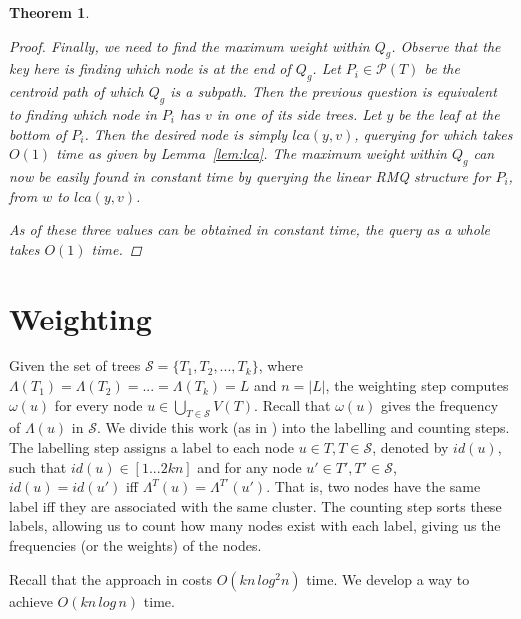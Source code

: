 \documentclass[12pt,a4paper]{article}
\newcommand{\leafset}{\Lambda}
\newcommand{\weight}{\omega}
\newtheorem{rmqquery}[incompatibility]{Theorem}
\begin{document}
\begin{rmqquery}
\begin{proof}
            Finally, we need to find the maximum weight within $Q_g$. Observe that the key here is finding which node is at the end of $Q_g$. Let $P_i \in \mathcal{P}(T)$ be the centroid path of which $Q_g$ is a subpath. Then the previous question is equivalent to finding which node in $P_i$ has $v$ in one of its side trees. Let $y$ be the leaf at the bottom of $P_i$. Then the desired node is simply $lca(y, v)$, querying for which takes $O(1)$ time as given by Lemma~\ref{lem:lca}. The maximum weight within $Q_g$ can now be easily found in constant time by querying the linear RMQ structure for $P_i$, from $w$ to $lca(y, v)$.

            As of these three values can be obtained in constant time, the query as a whole takes $O(1)$ time.
        \end{proof}
    \end{rmqquery}

    \section{Weighting}
    \label{sec:weighting}

    Given the set of trees $\mathcal{S} = \{T_1, T_2, ..., T_k\}$, where $\leafset(T_1) = \leafset(T_2) = ... = \leafset(T_k) = L$ and $n = |L|$, the weighting step computes $\weight(u)$ for every node $u \in \bigcup_{T \in \mathcal{S}}V(T)$. Recall that $\weight(u)$ gives the frequency of $\leafset(u)$ in $\mathcal{S}$. We divide this work (as in \cite{gawrychowski2017faster}) into the labelling and counting steps. The labelling step assigns a label to each node $u \in T, T \in \mathcal{S}$, denoted by $id(u)$, such that $id(u) \in [1 ... 2kn]$ and for any node $u' \in T', T' \in \mathcal{S}$, $id(u) = id(u')$ iff $\leafset^T(u) = \leafset^{T'}(u')$. That is, two nodes have the same label iff they are associated with the same cluster. The counting step sorts these labels, allowing us to count how many nodes exist with each label, giving us the frequencies (or the weights) of the nodes.

    Recall that the approach in \cite{gawrychowski2017faster} costs $O(kn\,log^2n)$ time. We develop a way to achieve $O(kn\,log\,n)$ time.
\end{document}
